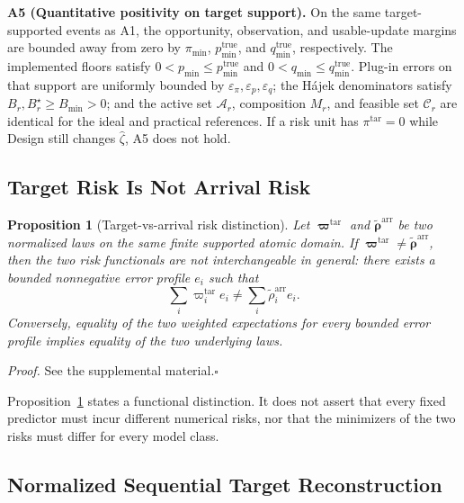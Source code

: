 \documentclass[letterpaper,journal]{IEEEtran}
\newtheorem{proposition}{Proposition}
\begin{document}
\noindent\textbf{A5 (Quantitative positivity on target support).}
On the same target-supported events as A1, the opportunity, observation,
and usable-update margins are bounded away from zero by
$\pi_{\min}$, $p_{\min}^{\mathrm{true}}$, and
$q_{\min}^{\mathrm{true}}$, respectively.  The implemented floors
satisfy $0<p_{\min}\le p_{\min}^{\mathrm{true}}$ and
$0<q_{\min}\le q_{\min}^{\mathrm{true}}$.  Plug-in errors on that
support are uniformly bounded by
$\varepsilon_\pi,\varepsilon_p,\varepsilon_q$; the H\'ajek
denominators satisfy $B_r,B_r^\star\ge B_{\min}>0$; and the active set
$\mathcal{A}_r$, composition $M_r$, and feasible set
$\mathcal{C}_r$ are identical for the ideal and practical references.
If a risk unit has $\pi^{\mathrm{tar}}=0$ while Design still changes
$\widehat\zeta$, A5 does not hold.

\subsection{Target Risk Is Not Arrival Risk}
\label{subsec:prop_risk}

\begin{proposition}[Target-vs-arrival risk distinction]
\label{prop:risk}
Let $\boldsymbol\varpi^{\mathrm{tar}}$ and
$\widetilde{\boldsymbol\rho}^{\mathrm{arr}}$ be two normalized laws on the same
finite supported atomic domain.  If
$\boldsymbol\varpi^{\mathrm{tar}}\neq\widetilde{\boldsymbol\rho}^{\mathrm{arr}}$,
then the two risk functionals are not interchangeable in general: there exists
a bounded nonnegative error profile $e_i$ such that
\begin{equation}
 \sum_i
 \varpi_i^{\mathrm{tar}}e_i
 \neq
 \sum_i
 \widetilde\rho_i^{\mathrm{arr}}e_i.
 \label{eq:prop1_nonidentity}
\end{equation}
Conversely, equality of the two weighted expectations for every bounded error
profile implies equality of the two underlying laws.
\end{proposition}

\noindent\emph{Proof.}
See the supplemental material.\hfill$\square$

Proposition~\ref{prop:risk} states a functional distinction.  It does not
assert that every fixed predictor must incur different numerical risks, nor
that the minimizers of the two risks must differ for every model class.

\subsection{Normalized Sequential Target Reconstruction}
\label{subsec:prop_reconstruction}
\end{document}
